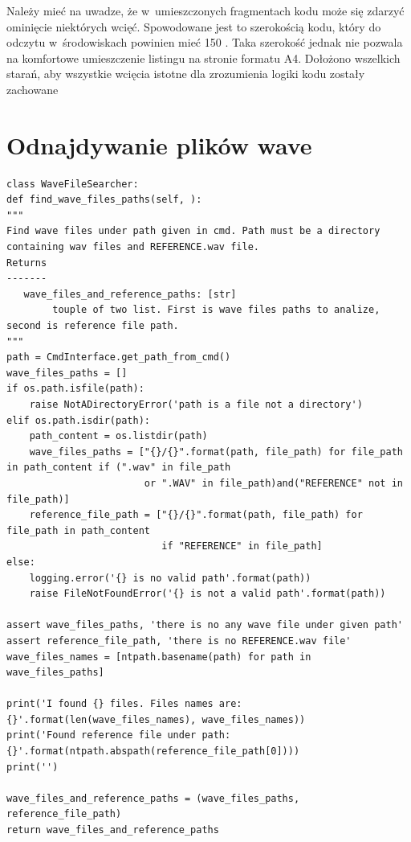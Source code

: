 \documentclass[eng,printmode]{mgr}
\begin{document}
Należy mieć na uwadze, że w~umieszczonych fragmentach kodu może się zdarzyć ominięcie niektórych wcięć. Spowodowane jest to szerokością kodu, który do odczytu w~środowiskach powinien mieć 150 \cite{PEP8}. Taka szerokość jednak nie pozwala na komfortowe umieszczenie listingu na stronie formatu A4. Dołożono wszelkich starań, aby wszystkie wcięcia istotne dla zrozumienia logiki kodu zostały zachowane
\newpage
\section{Odnajdywanie plików wave}
\begin{minipage}{\linewidth}
\begin{lstlisting}[caption={fragment kodu źródłowego pliku WaveFileSearcher.py},captionpos=b,label={WaveFileSearcher}]
class WaveFileSearcher:
def find_wave_files_paths(self, ):
"""
Find wave files under path given in cmd. Path must be a directory containing wav files and REFERENCE.wav file.
Returns
-------
   wave_files_and_reference_paths: [str]
        touple of two list. First is wave files paths to analize, second is reference file path.
"""
path = CmdInterface.get_path_from_cmd()
wave_files_paths = []
if os.path.isfile(path):
    raise NotADirectoryError('path is a file not a directory')
elif os.path.isdir(path):
    path_content = os.listdir(path)
    wave_files_paths = ["{}/{}".format(path, file_path) for file_path in path_content if (".wav" in file_path
                        or ".WAV" in file_path)and("REFERENCE" not in file_path)]
    reference_file_path = ["{}/{}".format(path, file_path) for file_path in path_content
                           if "REFERENCE" in file_path]
else:
    logging.error('{} is no valid path'.format(path))
    raise FileNotFoundError('{} is not a valid path'.format(path))

assert wave_files_paths, 'there is no any wave file under given path'
assert reference_file_path, 'there is no REFERENCE.wav file'
wave_files_names = [ntpath.basename(path) for path in wave_files_paths]

print('I found {} files. Files names are: {}'.format(len(wave_files_names), wave_files_names))
print('Found reference file under path: {}'.format(ntpath.abspath(reference_file_path[0])))
print('')

wave_files_and_reference_paths = (wave_files_paths, reference_file_path)
return wave_files_and_reference_paths

\end{lstlisting}
\end{minipage}
\end{document}
